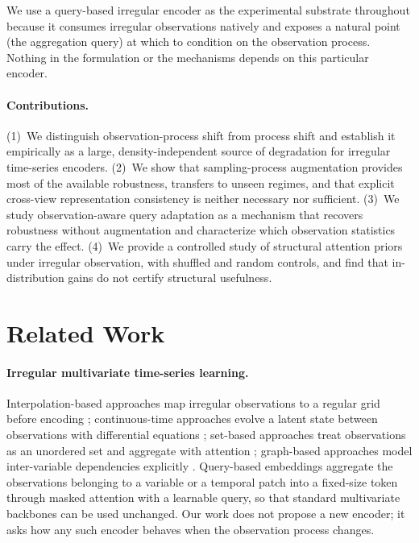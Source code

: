 \documentclass[sigconf,nonacm]{acmart}
\begin{document}
We use a query-based irregular encoder \cite{lim2026quite} as the experimental substrate throughout because it
consumes irregular observations natively and exposes a natural point (the aggregation query) at which to condition
on the observation process. Nothing in the formulation or the mechanisms depends on this particular encoder.

\paragraph{Contributions.}
(1)~We distinguish observation-process shift from process shift and establish it empirically as a large,
density-independent source of degradation for irregular time-series encoders.
(2)~We show that sampling-process augmentation provides most of the available robustness, transfers to unseen
regimes, and that explicit cross-view representation consistency is neither necessary nor sufficient.
(3)~We study observation-aware query adaptation as a mechanism that recovers robustness without augmentation and
characterize which observation statistics carry the effect.
(4)~We provide a controlled study of structural attention priors under irregular observation, with shuffled and
random controls, and find that in-distribution gains do not certify structural usefulness.

\section{Related Work}
\paragraph{Irregular multivariate time-series learning.}
Interpolation-based approaches map irregular observations to a regular grid before encoding
\cite{shukla2019ipn}; continuous-time approaches evolve a latent state between observations with differential
equations \cite{rubanova2019latentode,debrouwer2019gruodebayes,kidger2020ncde}; set-based approaches treat
observations as an unordered set and aggregate with attention \cite{horn2020seft,shukla2021mtand};
graph-based approaches model inter-variable dependencies explicitly \cite{zhang2022raindrop,zhang2024tpatchgnn}.
Query-based embeddings \cite{lim2026quite} aggregate the observations belonging to a variable or a temporal patch
into a fixed-size token through masked attention with a learnable query, so that standard multivariate backbones
\cite{liu2024itransformer,nie2023patchtst} can be used unchanged. Our work does not propose a new encoder; it asks
how any such encoder behaves when the observation process changes.
\end{document}
